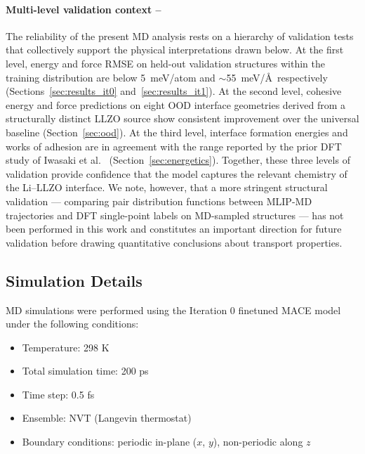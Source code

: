 \documentclass[12pt,a4paper,oneside]{book}
\begin{document}
\paragraph{Multi-level validation context --}
The reliability of the present MD analysis rests on a hierarchy of validation tests that collectively support the physical interpretations drawn below. At the first level, energy and force RMSE on held-out validation structures within the training distribution are below 5~meV/atom and $\sim$55~meV/\AA\ respectively (Sections~\ref{sec:results_it0} and~\ref{sec:results_it1}). At the second level, cohesive energy and force predictions on eight OOD interface geometries derived from a structurally distinct LLZO source show consistent improvement over the universal baseline (Section~\ref{sec:ood}). At the third level, interface formation energies and works of adhesion are in agreement with the range reported by the prior DFT study of Iwasaki et al.~\cite{Iwasaki2022DFT_Li_LLZO_PSSB} (Section~\ref{sec:energetics}). Together, these three levels of validation provide confidence that the model captures the relevant chemistry of the Li--LLZO interface. We note, however, that a more stringent structural validation --- comparing pair
distribution functions between MLIP-MD trajectories and DFT single-point labels
on MD-sampled structures --- has not been performed in this work and constitutes
an important direction for future validation before drawing quantitative conclusions
about transport properties.


\subsection{Simulation Details}

MD simulations were performed using the Iteration 0 finetuned MACE model under the following conditions:

\begin{itemize}
    \item Temperature: 298 K
    \item Total simulation time: 200 ps
    \item Time step: 0.5 fs
    \item Ensemble: NVT (Langevin thermostat)
    \item Boundary conditions: periodic in-plane ($x$, $y$), non-periodic along $z$
\end{itemize}
\end{document}
